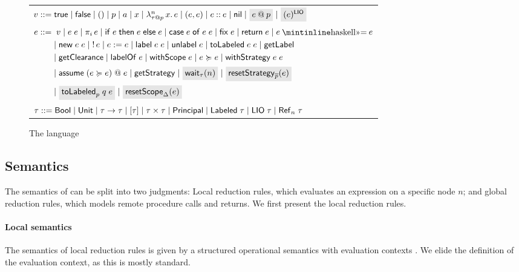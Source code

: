 \begin{figure*}
    \centering
    \begin{tabular}{l}
         $\val ::= \true \mid \false \mid () \mid p \mid \addr \mid x \mid \abs{n}{\lb{p}{\type}}{x}{\expr} \mid (\expr, \expr) \mid \cons{\expr}{\expr} \mid \nil \mid \graybox{\lb{p}{\expr}} \mid \graybox{\lio{\expr}}$ \\
         $\begin{aligned}[t]
         \expr ::=&\;\; \val \mid \app{\expr}{\expr} \mid \proj{i}{\expr} \mid \ifexpr{\expr}{\expr}{\expr} \mid \case{\expr}{\expr}{\expr} \mid \fix{\expr} \mid \return{\expr} \mid \bind{\expr}{\expr} \\ &\mid
         \new{\expr}{\expr} \mid \readref{\expr} \mid \writeref{\expr}{\expr} \mid \Label{\expr}{\expr} \mid \unlabel{\expr} \mid
         \tolabeled{\expr}{\expr} \mid \getlabel \\ &\mid \getclearance \mid \labelof{\expr} \mid \withscope{\expr} \mid \expr \actsfor \expr \mid \withstrategy{\expr}{\expr} \\ &\mid \adddelegate{\expr}{\expr}{\expr} \mid \getstrategy \mid \graybox{\wait{n}[\type]} \mid \graybox{\resetstrategy{\overline{p}}{\expr}} \\ &\mid \graybox{\resetTolabeled{p}{q}{\expr}} \mid \graybox{\resetscope{\scope}{\expr}}
         \end{aligned}$ \\
         $\type ::= \bool \mid \unit \mid \func{\type}{\type} \mid \listtype{\type} \mid \pair{\type}{\type} \mid \labeltype \mid \labeled{\type} \mid \liotype{\type} \mid \reftype[n]{\type}$ \\
    \end{tabular}
    \caption{The \lang{} language}
    \label{fig:language-syntax}
\end{figure*}

\subsection{Semantics}
The semantics of \lang{} can be split into two judgments: Local reduction rules, which evaluates an expression on a specific node $n$; and global reduction rules, which models remote procedure calls and returns. We first present the local reduction rules.

\paragraph{Local semantics}
The semantics of local reduction rules is given by a structured operational semantics with evaluation contexts \cite{cite-felleisen-duh}. We elide the definition of the evaluation context, as this is mostly standard.

